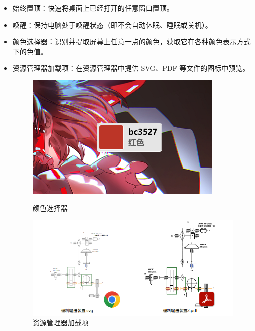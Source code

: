 \begin{itemize}
  \item 始终置顶：快速将桌面上已经打开的任意窗口置顶。
  \item 唤醒：保持电脑处于唤醒状态（即不会自动休眠、睡眠或关机）。
  \item 颜色选择器：识别并提取屏幕上任意一点的颜色，获取它在各种颜色表示方式下的色值。
  \item 资源管理器加载项：在资源管理器中提供 SVG、PDF 等文件的图标中预览。
    \begin{figure}[htb!]
        \centering
        \begin{minipage}{.45\textwidth}
          \centering
          \includegraphics[width=.98\textwidth]{assets/software/Color_Picker.png}
          \caption{颜色选择器}
          \label{fig:Color_Picker}
        \end{minipage}
        \begin{minipage}{.54\textwidth}
          \centering
          \includegraphics[width=.98\textwidth]{assets/software/Explorer_Addon.png}
          \caption{资源管理器加载项}
          \label{fig:Explorer_Addon}
        \end{minipage}

\end{figure}
\end{itemize}

